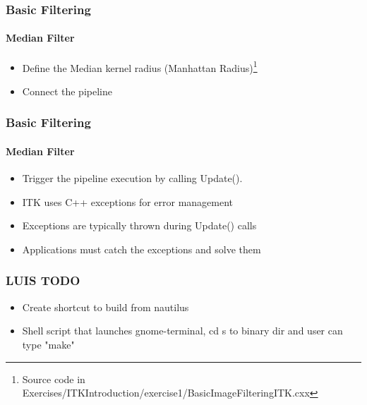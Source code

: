 {
\begin{frame}[fragile]
\frametitle{Basic Filtering}
\framesubtitle{Median Filter}
\begin{itemize}
\item Define the Median kernel radius (Manhattan Radius)\footnote{Source code in Exercises/ITKIntroduction/exercise1/BasicImageFilteringITK.cxx}
\end{itemize}
\begin{center}

\end{center}
\pause
\begin{itemize}
\item Connect the pipeline
\end{itemize}
\begin{center}

\end{center}
\end{frame}
}

{
\begin{frame}[fragile]
\frametitle{Basic Filtering}
\framesubtitle{Median Filter}
\begin{itemize}
\item Trigger the pipeline execution by calling Update().
\end{itemize}
\begin{center}

\end{center}
\pause
\begin{itemize}
\item ITK uses C++ exceptions for error management
\item Exceptions are typically thrown during Update() calls
\item Applications must catch the exceptions and solve them
\end{itemize}
\end{frame}
}


\begin{frame}
\frametitle{LUIS TODO}
\begin{itemize}
\item Create shortcut to build from nautilus
\item Shell script that launches gnome-terminal, cd s to binary dir and user can type "make"
\end{itemize}
\end{frame}


